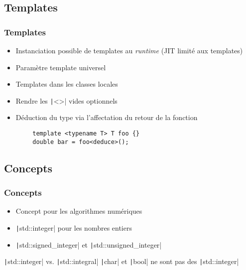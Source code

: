 \documentclass[C++.tex]{subfiles}
\begin{document}
\subsection*{Templates}
\begin{frame}[fragile]
	\frametitle{Templates}
	\begin{itemize}
		\item Instanciation possible de templates au \textit{runtime} (JIT limité aux templates)


		\item Paramètre template universel


		\item Templates dans les classes locales
		\item Rendre les \texttt|<>| vides optionnels
		\item Déduction du type via l'affectation du retour de la fonction
	\end{itemize}

	\begin{verbatim}
		template <typename T> T foo {}
		double bar = foo<deduce>();
	\end{verbatim}

\end{frame}

\subsection*{Concepts}
\begin{frame}[fragile]
	\frametitle{Concepts}
	\begin{itemize}
		\item Concept pour les algorithmes numériques
		\item \texttt|std::integer| pour les nombres entiers
		\item \texttt|std::signed_integer| et \texttt|std::unsigned_integer|
	\end{itemize}

	\begin{block}{\texttt|std::integer| vs. \texttt|std::integral|}
		\texttt|char| et \texttt|bool| ne sont pas des \texttt|std::integer|
	\end{block}

\end{frame}
\end{document}
